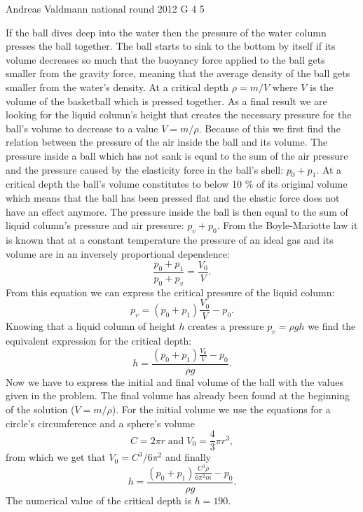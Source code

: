 \documentclass[11pt]{article}
\begin{document}
{Andreas Valdmann} %
{national round} %
{2012} %
{G 4} %
{5} %
{

\ifEngSolution
If the ball dives deep into the water then the pressure of the water column presses the ball together. The ball starts to sink to the bottom by itself if its volume decreases so much that the buoyancy force applied to the ball gets smaller from the gravity force, meaning that the average density of the ball gets smaller from the water’s density. At a critical depth $\rho=m/V$ where $V$ is the volume of the basketball which is pressed together. As a final result we are looking for the liquid column’s height that creates the necessary pressure for the ball’s volume to decrease to a value $V=m/\rho$. Because of this we first find the relation between the pressure of the air inside the ball and its volume. The pressure inside a ball which has not sank is equal to the sum of the air pressure and the pressure caused by the elasticity force in the ball’s shell: $p_0+p_1$. At a critical depth the ball’s volume constitutes to below 10 \% of its original volume which means that the ball has been pressed flat and the elastic force does not have an effect anymore. The pressure inside the ball is then equal to the sum of liquid column’s pressure and air pressure: $p_v+p_0$. From the Boyle-Mariotte law it is known that at a constant temperature the pressure of an ideal gas and its volume are in an inversely proportional dependence:
\[
\frac{p_0+p_1}{p_0+p_v}=\frac{V_0}{V}.
\]
From this equation we can express the critical pressure of the liquid column:
\[
p_v = (p_0+p_1) \frac{V_0}{V} - p_0.
\] 
Knowing that a liquid column of height $h$ creates a pressure $p_v=\rho g h$ we find the equivalent expression for the critical depth:
\[
h = \frac{(p_0+p_1) \frac{V_0}{V} - p_0}{\rho g}.
\] 
Now we have to express the initial and final volume of the ball with the values given in the problem. The final volume has already been found at the beginning of the solution ($V=m/\rho$). For the initial volume we use the equations for a circle’s circumference and a sphere’s volume
\[
C = 2\pi r \; \text{and} \; V_0 = \frac{4}{3}\pi r^3,
\] 
from which we get that $V_0=C^3/6\pi^2$ and finally
\[
h = \frac{(p_0+p_1) \frac{C^3 \rho}{6\pi^2 m} - p_0}{\rho g}.
\] 
The numerical value of the critical depth is $h=190$.
\fi
}
\end{document}
